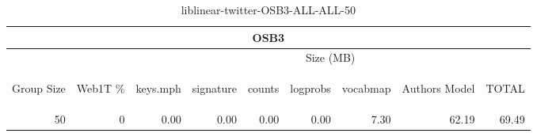 \begin{center}
\begin{table}[htbp]
\begin{tabular}{ | r | r | r | r | r | r | r | r | r |}
\hline
\multicolumn{9}{|c|}{OSB3}\\
\hline
 & & \multicolumn{7}{|c|}{Size (MB)}\\ \cline{3-9}
\begin{sideways}Group Size\end{sideways} & \begin{sideways}Web1T \% \end{sideways} & \begin{sideways}keys.mph\end{sideways} & \begin{sideways}signature\end{sideways} & \begin{sideways}counts\end{sideways} & \begin{sideways}logprobs\end{sideways} & \begin{sideways}vocabmap\end{sideways} & \begin{sideways}Authors Model \end{sideways} & \begin{sideways}TOTAL\end{sideways}\\
\hline
\multirow{0}{*}{50}
 & 0 & 0.00 & 0.00 & 0.00 & 0.00 & 7.30 & 62.19 & 69.49\\ \cline{2-9}
\hline
\end{tabular}
\caption{liblinear-twitter-OSB3-ALL-ALL-50}
\label{table:liblinear-twitter-OSB3-ALL-ALL-50}
\end{table}
\end{center}

